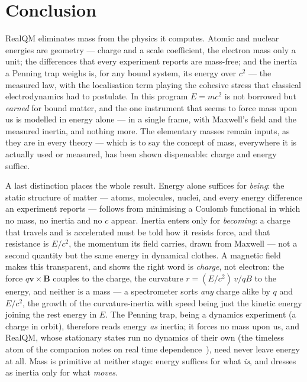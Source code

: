 \documentclass[11pt]{article}
\begin{document}
\section{Conclusion}
RealQM eliminates mass from the physics it computes. Atomic and nuclear energies are geometry --- charge and a
scale coefficient, the electron mass only a unit; the differences that every experiment reports are mass-free; and
the inertia a Penning trap weighs is, for any bound system, its energy over $c^2$ --- the measured law, with the
localisation term playing the cohesive stress that classical electrodynamics had to postulate. In this program
$E=mc^2$ is not borrowed but \emph{earned} for bound matter, and the one instrument that seems to force mass upon
us is modelled in energy alone --- in a single frame, with Maxwell's field and the measured inertia, and nothing
more. The elementary masses remain inputs, as they are in every theory --- which is to say the
concept of mass, everywhere it is actually used or measured, has been shown dispensable: charge and energy
suffice.

A last distinction places the whole result. Energy alone suffices for \emph{being}: the static structure of matter
--- atoms, molecules, nuclei, and every energy difference an experiment reports --- follows from minimising a
Coulomb functional in which no mass, no inertia and no $c$ appear. Inertia enters only for \emph{becoming}: a charge
that travels and is accelerated must be told how it resists force, and that resistance is $E/c^2$, the momentum its
field carries, drawn from Maxwell --- not a second quantity but the same energy in dynamical clothes. A magnetic
field makes this transparent, and shows the right word is \emph{charge}, not electron: the force
$q\mathbf v\times\mathbf B$ couples to the charge, the curvature $r=(E/c^2)\,v/qB$ to the energy, and neither is a
mass --- a spectrometer sorts \emph{any} charge alike by $q$ and $E/c^2$, the growth of the
curvature-inertia with speed being just the kinetic energy joining the rest energy in $E$. The Penning
trap, being a dynamics experiment (a charge in orbit), therefore reads energy \emph{as} inertia; it forces no mass
upon us, and RealQM, whose stationary states run no dynamics of their own (the timeless atom of the companion notes
on real time dependence~\cite{Time,Dynamics}), need never leave energy at all. Mass is primitive at neither stage: energy suffices for
what \emph{is}, and dresses as inertia only for what \emph{moves}.
\end{document}
